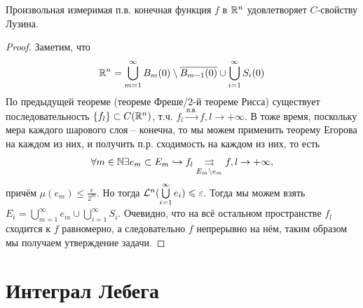 \begin{theorem}[Лузина]
    Произвольная измеримая п.в. конечная функция $f$ в $\mathbb{R}^n$ удовлетворяет $C$-свойству Лузина.
\end{theorem}
\begin{proof}
    Заметим, что \[\mathbb{R}^n = \bigcup\limits_{m = 1}^\infty B_m(0) \setminus \overline{B_{m - 1}(0)} \cup \bigcup\limits_{i = 1}^\infty S_i(0)\]
    По предыдущей теореме (теореме Фреше/2-й теореме Рисса) существует последовательность $\{f_l\} \subset C(\mathbb{R}^n)$, т.ч. $f_l \xrightarrow{\text{п.в.}} f, l \rightarrow +\infty$. В тоже время, поскольку мера каждого шарового слоя -- конечна, то мы можем применить теорему Егорова на каждом из них, и получить п.р. сходимость на каждом из них, то есть \[\forall m \in \mathbb{N} \exists e_m \subset E_m \hookrightarrow f_l \underset{E_m \setminus e_m}{\rightrightarrows} f, l \rightarrow +\infty,\]
    причём $\mu(e_m) \leq \frac{\epsilon}{2^m}$.
    Но тогда $\mathcal{L}^n(\bigcup\limits_{i = 1}^\infty e_i) \leqslant \varepsilon$. Тогда мы можем взять $E_\epsilon = \bigcup\limits_{m = 1}^\infty e_m \cup \bigcup\limits_{i = 1}^\infty S_i$. Очевидно, что на всё остальном пространстве $f_l$ сходится к $f$ равномерно, а следовательно $f$ непрерывно на нём, таким образом мы получаем утверждение задачи.
\end{proof}

\section{Интеграл Лебега}
